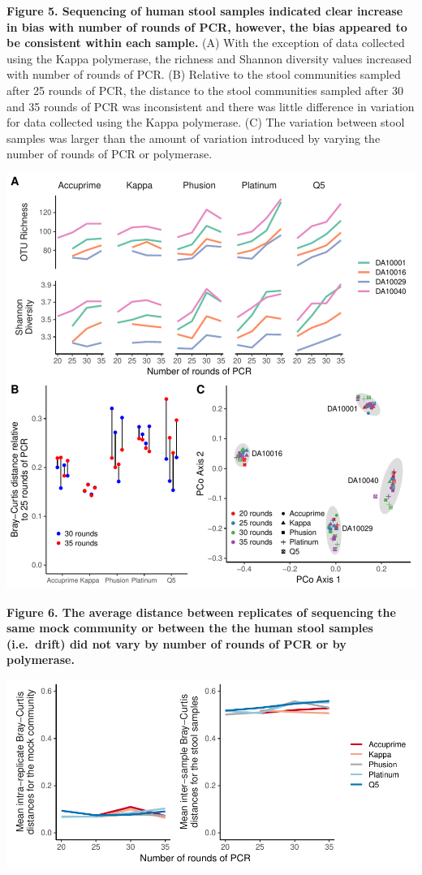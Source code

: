\documentclass[11pt,]{article}
\begin{document}
\newpage

\textbf{Figure 5. Sequencing of human stool samples indicated clear
increase in bias with number of rounds of PCR, however, the bias
appeared to be consistent within each sample.} (A) With the exception of
data collected using the Kappa polymerase, the richness and Shannon
diversity values increased with number of rounds of PCR. (B) Relative to
the stool communities sampled after 25 rounds of PCR, the distance to
the stool communities sampled after 30 and 35 rounds of PCR was
inconsistent and there was little difference in variation for data
collected using the Kappa polymerase. (C) The variation between stool
samples was larger than the amount of variation introduced by varying
the number of rounds of PCR or polymerase.

\includegraphics[width=0.9\columnwidth]{../results/figures/stool_community.pdf}

\newpage

\textbf{Figure 6. The average distance between replicates of sequencing
the same mock community or between the the human stool samples
(i.e.~drift) did not vary by number of rounds of PCR or by polymerase.}

\includegraphics[width=1.0\columnwidth]{../results/figures/drift.pdf}
\end{document}
